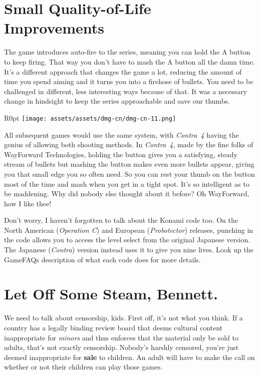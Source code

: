 \documentclass{book}
\begin{document}
\FloatBarrier\needspace{10mm}\section*{Small Quality-of-Life Improvements}\nopagebreak[4]

The game introduces auto-fire to the series, meaning you can hold the A button to keep firing. That way you don’t have to mash the A button all the damn time. It’s a different approach that changes the game a lot, reducing the amount of time you spend aiming and it turns you into a firehose of bullets. You need to be challenged in different, less interesting ways because of that. It was a necessary change in hindsight to keep the series approachable and save our thumbs.

\begin{wrapfigure}{R}{0pt} \texttt{[image: assets/assets/dmg-cn/dmg-cn-11.png]}\end{wrapfigure}
All subsequent games would use the same system, with \emph{Contra 4} having the genius of allowing both shooting methods. In \emph{Contra 4}, made by the fine folks of WayForward Technologies, holding the button gives you a satisfying, steady stream of bullets but mashing the button makes even more bullets appear, giving you that small edge you so often need. So you can rest your thumb on the button most of the time and mash when you get in a tight spot. It’s so intelligent as to be maddening. Why did nobody else thought about it before? Oh WayForward, how I like thee!

Don’t worry, I haven’t forgotten to talk about the Konami code too. On the North American (\emph{Operation C}) and European (\emph{Probotector}) releases, punching in the code allows you to access the level select from the original Japanese version. The Japanese (\emph{Contra}) version instead uses it to give you nine lives. Look up the GameFAQs description of what each code does for more details.

\FloatBarrier\needspace{10mm}\section*{Let Off Some Steam, Bennett.}\nopagebreak[4]

We need to talk about censorship, kids. First off, it’s not what you think. If a country has a legally binding review board that deems cultural content inappropriate for \emph{minors} and thus enforces that the material only be sold to adults, that’s not exactly censorship. Nobody’s harshly censored, you’re just deemed inappropriate for \textbf{sale} to children. An adult will have to make the call on whether or not their children can play those games.
\end{document}
